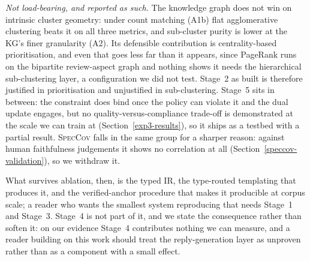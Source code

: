 \documentclass[preprint,12pt]{elsarticle}
\begin{document}
\emph{Not load-bearing, and reported as such.} The knowledge graph does not win on intrinsic
cluster geometry: under count matching (A1b) flat agglomerative clustering beats it on all three
metrics, and sub-cluster purity is lower at the KG's finer granularity (A2). Its defensible
contribution is centrality-based prioritisation, and even that goes less far than it appears,
since PageRank runs on the bipartite review-aspect graph and nothing shows it needs the
hierarchical sub-clustering layer, a configuration we did not test. Stage~2 as built is therefore
justified in prioritisation and unjustified in sub-clustering. Stage~5 sits in between: the
constraint does bind once the policy can violate it and the dual update engages, but no
quality-versus-compliance trade-off is demonstrated at the scale we can train at
(Section~\ref{exp3-results}), so it ships as a testbed with a partial result. \textsc{SpecCov}
falls in the same group for a sharper reason: against human faithfulness judgements it shows no
correlation at all (Section~\ref{speccov-validation}), so we withdraw it.

What survives ablation, then, is the typed IR, the type-routed templating that produces it, and
the verified-anchor procedure that makes it producible at corpus scale; a reader who wants the
smallest system reproducing that needs Stage~1 and Stage~3. Stage~4 is not part of it, and we
state the consequence rather than soften it: on our evidence Stage~4 contributes nothing we can
measure, and a reader building on this work should treat the reply-generation layer as unproven
rather than as a component with a small effect.
\end{document}
